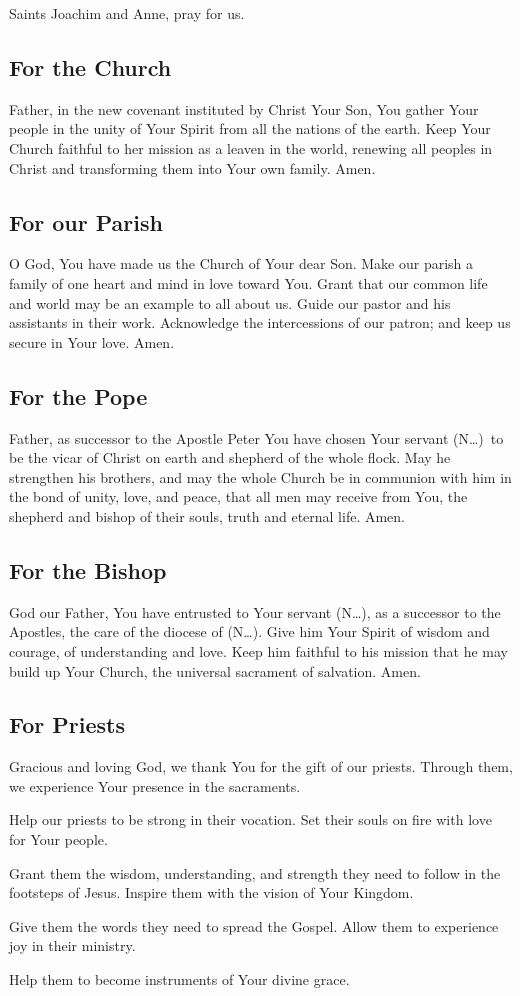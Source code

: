 \documentclass[12pt]{article}
\newcommand{\prayertitle}[1]{\subsection{#1}}
\newcommand{\insertname}{(N\dots)}
\begin{document}
Saints Joachim and Anne, pray for us.

\prayertitle{For the Church}
Father, in the new covenant instituted by Christ Your Son, You gather Your people in the unity of Your Spirit from all the nations of the earth.
Keep Your Church faithful to her mission as a leaven in the world, renewing all peoples in Christ and transforming them into Your own family.
Amen.

\prayertitle{For our Parish}
O God, You have made us the Church of Your dear Son.
Make our parish a family of one heart and mind in love toward You.
Grant that our common life and world may be an example to all about us.
Guide our pastor and his assistants in their work.
Acknowledge the intercessions of our patron; and keep us secure in Your love.
Amen.

\prayertitle{For the Pope}
Father, as successor to the Apostle Peter You have chosen Your servant \insertname\ to be the vicar of Christ on earth and shepherd of the whole flock.
May he strengthen his brothers, and may the whole Church be in communion with him in the bond of unity, love, and peace, that all men may receive from You, the shepherd and bishop of their souls, truth and eternal life.
Amen.

\prayertitle{For the Bishop}
God our Father, You have entrusted to Your servant \insertname, as a successor to the Apostles, the care of the diocese of \insertname.
Give him Your Spirit of wisdom and courage, of understanding and love.
Keep him faithful to his mission that he may build up Your Church, the universal sacrament of salvation.
Amen.

\prayertitle{For Priests}
Gracious and loving God, we thank You for the gift of our priests.
Through them, we experience Your presence in the sacraments.

Help our priests to be strong in their vocation.
Set their souls on fire with love for Your people.

Grant them the wisdom, understanding, and strength they need to follow in the footsteps of Jesus.
Inspire them with the vision of Your Kingdom.

Give them the words they need to spread the Gospel.
Allow them to experience joy in their ministry.

Help them to become instruments of Your divine grace.
\end{document}
